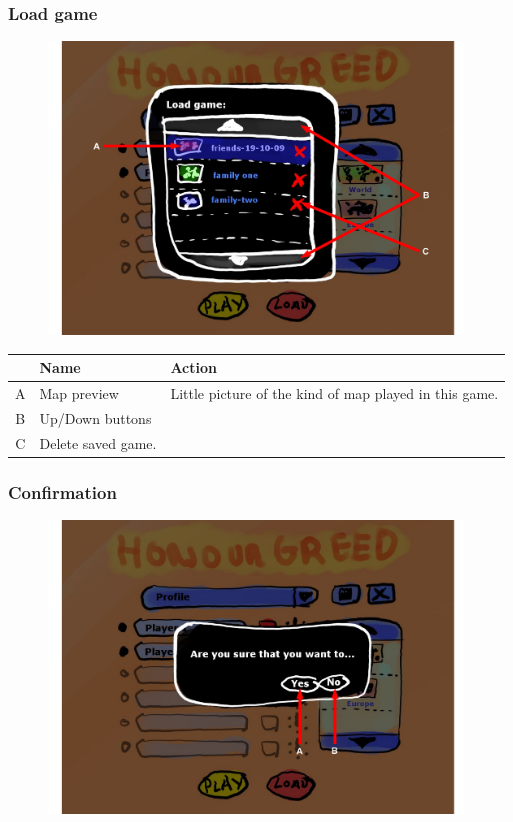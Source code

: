 \documentclass[12pt,a4paper]{article}
\begin{document}
\subsubsection{Load game}

\begin{figure}[H]
  \centering
  \includegraphics[width=11cm]{pic/mocks/1-3.pdf}
\end{figure}

\begin{table}[H]
\small
\centering
\begin{tabular}{c|p{5cm}|p{7cm}}
& Name & Action \\ \hline\hline
A
&Map preview
&Little picture of the kind of map played in this game.
\\B
&Up/Down buttons
\\C
&Delete saved game.

\end{tabular}
\end{table}

\subsubsection{Confirmation}
\begin{figure}[H]
  \centering
  \includegraphics[width=11cm]{pic/mocks/1-4.pdf}
\end{figure}
\end{document}
